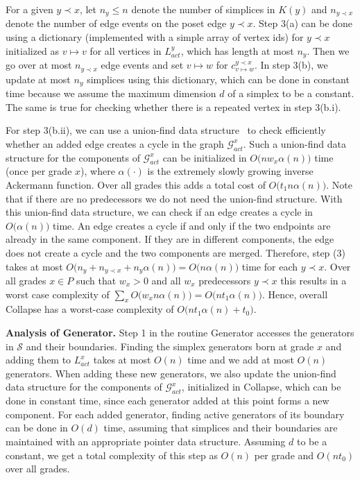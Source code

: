\documentclass[english,a4paper,nolineno,cleveref]{socg-lipics-v2021}
\newcommand{\G}{\mathcal G}
\newcommand{\Scal}{\mathcal S}
\begin{document}
For a given $y\prec x$, let $n_y\leq n$ denote the number of simplices in $K(y)$ and $n_{y\prec x}$ denote the number of edge events on the poset edge $y\prec x$. Step 3(a) can be done using a dictionary (implemented with a simple array of vertex ids) for $y\prec x$ initialized as $v\mapsto v$ for all vertices in $L^y_{act}$, which has length at most $n_y$. Then we go over at most $n_{y\prec x}$ edge events and set $v\mapsto w$ for $c_{v\mapsto w}^{y\prec x}$. In step 3(b), we update at most $n_y$ simplices using this dictionary, which can be done in constant time because we assume the maximum dimension $d$ of a simplex to be a constant. The same is true for checking whether there is a repeated vertex in step 3(b.i).

For step 3(b.ii), we can use a union-find data structure~\cite{CLRbook} to check efficiently
whether an added edge creates a cycle in the graph $\G^x_{act}$. Such a union-find data structure for the components of $\mathcal{G}_{act}^x$ can be initialized in $O\big(nw_x\alpha(n)\big)$ time (once per grade $x$), where $\alpha(\cdot)$ is the 
extremely slowly growing inverse Ackermann function. Over all grades this adds a total cost of $O\big(t_1n\alpha(n)\big)$. Note that if there are no predecessors we do not need the union-find structure. With this union-find data structure, we can check if an edge creates a cycle in $O\big(\alpha(n)\big)$ time. An edge creates a cycle if and only if the two endpoints are already in the same component. If they are in different components, the edge does not create a cycle and the two components are merged. Therefore, step (3) takes at most $O\big(n_y+n_{y\prec x}+n_y\alpha(n)\big)=O\big(n\alpha(n)\big)$ time for each $y\prec x$. Over all grades $x\in P$ such that $w_x>0$ and all $w_x$ predecessors $y\prec x$ this results in a worst case complexity of $\sum_x O\big(w_x n\alpha(n)\big)=O\big(nt_1\alpha(n)\big)$. Hence, overall {\sc Collapse} has a worst-case complexity of $O\big(nt_1\alpha(n)+t_0\big)$.   

\vspace{2pt}
{\bf Analysis of {\sc Generator}.}
Step 1 in the routine {\sc Generator} accesses the generators in $\Scal$ and their
boundaries. Finding the simplex generators born at grade $x$ and adding them to $L_{act}^x$ takes at most $O(n)$ time and we add at most $O(n)$ generators. When adding these new generators, we also update the union-find data structure for the components of $\mathcal{G}_{act}^x$, initialized in {\sc Collapse}, which can be done in constant time, since each generator added at this point forms a new component. For each added generator, finding active generators of its boundary can be done in $O(d)$ time, assuming that simplices and their boundaries are maintained
with an appropriate pointer data structure. Assuming $d$ to be a constant, we get a total
complexity of this step as $O(n)$ per grade and $O(nt_0)$ over all grades. 
\end{document}
